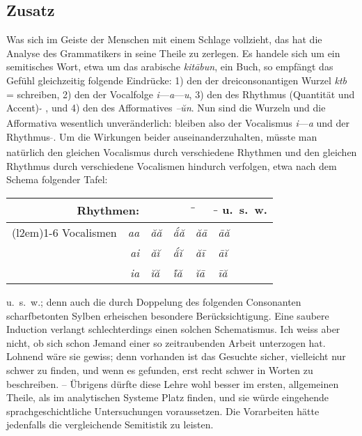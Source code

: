 \subsection*{Zusatz}\label{II.VI.zusatz}

Was sich im Geiste der Menschen mit einem Schlage vollzieht, das hat die Analyse des Grammatikers in seine Theile zu zerlegen. Es handele sich um ein semitisches Wort, etwa um das arabische  \textit{kitābun}, ein Buch, so empfängt das Gefühl gleichzeitig folgende Eindrücke: 1) den der dreiconsonantigen Wurzel \textit{ktb} = schreiben, 2) den der Vocalfolge \textit{i}—\textit{a}—\textit{u}, 3) den des Rhythmus (Quantität und Accent) \textsubscript{\LARGE \textbreve{ } \'̄ \textbreve{ }}, und 4) den des Afformatives \textit{–ŭn}. Nun sind die \label{sp.93} Wurzeln und die Afformativa wesentlich unveränderlich: bleiben also der Vocalismus \textit{i}—\textit{a} und der Rhythmus \textsubscript{\LARGE \textbreve{ } ̄}. Um die Wirkungen beider auseinanderzuhalten, müsste man natürlich den gleichen Vocalismus durch verschiedene Rhythmen und den gleichen Rhythmus durch verschiedene Vocalismen hindurch verfolgen, etwa nach dem Schema folgender Tafel:

\begin{table}[h]
\centering
\begin{tabular}{r r | l | l | l | l}
 \multicolumn{2}{r|}{Rhythmen:} & \textsubscript{\LARGE \textbreve{ }\textbreve{ }} & \textsubscript{\LARGE \raisebox{1.5mm}[1.5mm]{\parbox{0mm}{\hspace*{0.2mm}\centering´}}\textbreve{ }\textbreve{ }} & \textsubscript{\LARGE \textbreve{ } ̄} & \enspace \textsubscript{\LARGE ̄\textbreve{ }} u.~s.~w. \\
\cmidrule(l{2em}){1-6}
Vocalismen & \textit{aa} & \textit{ăă} & \textit{ắă} & \textit{ăā} & \textit{āă} \\
 & \textit{ai} & \textit{ăĭ} & \textit{ắĭ} & \textit{ăī} & \textit{āĭ} \\
 & \textit{ia} & \textit{ĭă} & \textit{\'ĭă} & \textit{ĭā} & \textit{īă}
\end{tabular}
\end{table}

\noindent u.~s.~w.; denn auch die durch Doppelung des folgenden Consonanten scharfbetonten Sylben erheischen besondere Berücksichtigung. Eine saubere Induction verlangt schlechterdings einen solchen Schematismus. Ich weiss aber nicht, ob sich schon Jemand einer so zeitraubenden Arbeit \label{fp.96} unterzogen hat. Lohnend wäre sie gewiss; denn vorhanden ist das Gesuchte sicher, vielleicht nur schwer zu finden, und wenn es gefunden, erst recht schwer in Worten zu beschreiben. – Übrigens dürfte diese Lehre wohl besser im ersten, allgemeinen Theile, als im analytischen Systeme Platz finden, und sie würde eingehende sprachgeschichtliche Untersuchungen voraussetzen. Die Vorarbeiten hätte jedenfalls die vergleichende Semitistik zu leisten.

